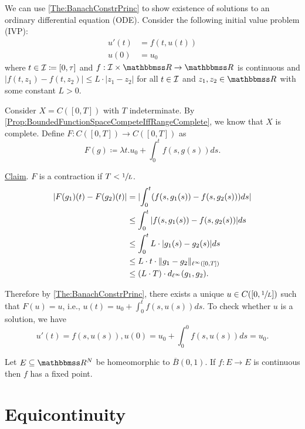\documentclass[screen,single]{techreport}
\numberwithin{equation}{section}
\begin{document}
\begin{example}\label{Exa:SolvingIVP}
  We can use \cref{The:BanachConstrPrinc} to show existence of solutions to an ordinary differential equation (ODE).
  Consider the following initial value problem (IVP):
  \begin{align*}
    u'(t) & = f(t, u(t)) \\
    u(0) & = u_0  
  \end{align*}
  where $t \in \mathcal{I} \coloneqq [0,\tau]$ and $f: \calI \times \bbR \to \bbR$ is continuous and $|f(t,z_1) - f(t,z_2)| \le L \cdot |z_1-z_2|$ for all $t \in \mathcal{I}$ and $z_1,z_2 \in \bbR$ with some constant $L > 0$.
  
  Consider $X = C([0,T])$ with $T$ indeterminate.
  By \cref{Prop:BoundedFunctionSpaceCompeteIffRangeComplete}, we know that $X$ is complete.
  Define $F : C([0,T]) \to C([0,T])$ as
  \[
  F(g) \coloneqq \lambda t. u_0 + \int_0^t f(s,g(s)) ds.
  \]
  
  \underline{Claim}. $F$ is a contraction if $T < \sfrac{1}{L}$.
  \begin{align*}
    |F(g_1)(t) - F(g_2)(t)| & = |{ \int_0^t ({ f(s,g_1(s)) - f(s,g_2(s)) }) ds  }| \\
    & \le \int_0^t |{f(s,g_1(s)) - f(s,g_2(s))}| ds \\
    & \le \int_0^t L \cdot |g_1(s) - g_2(s)| ds \\
    & \le L \cdot t \cdot \|{g_1-g_2}\|_{\ell^\infty([0,T])} \\
    & \le (L \cdot T) \cdot d_{\ell^\infty}(g_1,g_2).
  \end{align*}

  Therefore by \cref{The:BanachConstrPrinc}, there exists a unique $u \in C([0,\sfrac{1}{L}])$ such that $F(u) = u$, i.e., $u(t) = u_0 + \int_0^t f(s,u(s)) ds$.
  To check whether $u$ is a solution, we have
  \[
    u'(t) =  f(s,u(s)), u(0) = u_0 + \int_0^0 f(s,u(s)) ds = u_0.
  \]

\end{example}

\begin{theorem}\label{The:BrouwerFixedPoint}
  Let $E \subseteq \bbR^N$ be homeomorphic to $\overline{B}(0,1)$.
  If $f : E \to E$ is continuous then $f$ has a fixed point.
\end{theorem}

\section{Equicontinuity}
\end{document}
